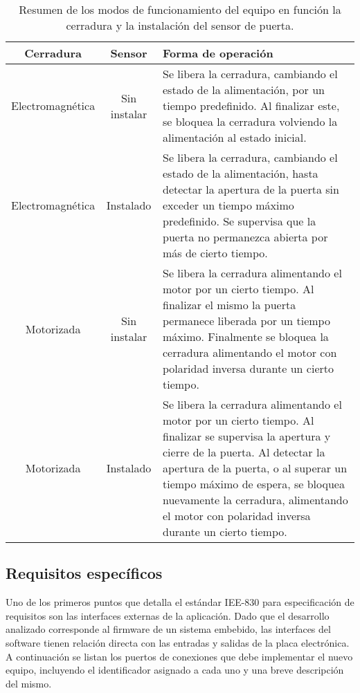 \begin{table}[ht]
	\centering
	\caption[Resumen de los modos de funcionamiento del equipo]{Resumen de los modos de funcionamiento del equipo en función la cerradura y la instalación del sensor de puerta.}
	\begin{tabular}{c c L{80mm}}
		\toprule
		\textbf{Cerradura} 	& 
		\textbf{Sensor}	&
		\textbf{Forma de operación} \\
		\midrule
		Electromagnética &
		Sin instalar &
		Se libera la cerradura, cambiando el estado de la alimentación, por un tiempo predefinido. Al finalizar este, se bloquea la cerradura volviendo la alimentación al estado inicial.\\
		\midrule
		Electromagnética &
		Instalado &
		Se libera la cerradura, cambiando el estado de la alimentación, hasta detectar la apertura de la puerta sin exceder un tiempo máximo predefinido. Se supervisa que la puerta no permanezca abierta por más de cierto tiempo.\\
		\midrule
		Motorizada &
		Sin instalar &
		Se libera la cerradura alimentando el motor por un cierto tiempo. Al finalizar el mismo la puerta permanece liberada por un tiempo máximo. Finalmente se bloquea la cerradura alimentando el motor con polaridad inversa durante un cierto tiempo.\\
		\midrule
		Motorizada &
		Instalado &
		Se libera la cerradura alimentando el motor por un cierto tiempo. Al finalizar se supervisa la apertura y cierre de la puerta. Al detectar la apertura de la puerta, o al superar un tiempo máximo de espera, se bloquea nuevamente la cerradura, alimentando el motor con polaridad inversa durante un cierto tiempo.\\
		\bottomrule
		\hline
	\end{tabular}
	\label{tab:ModosOperacion}
\end{table}

\subsection{Requisitos específicos}
\label{sub:Requisitos}

Uno de los primeros puntos que detalla el estándar IEE-830 para especificación de requisitos son las interfaces externas de la aplicación. Dado que el desarrollo analizado corresponde al firmware de un sistema embebido, las interfaces del software tienen relación directa con las entradas y salidas de la placa electrónica. A continuación se listan los puertos de conexiones que debe implementar el nuevo equipo, incluyendo el identificador asignado a cada uno y una breve descripción del mismo.

